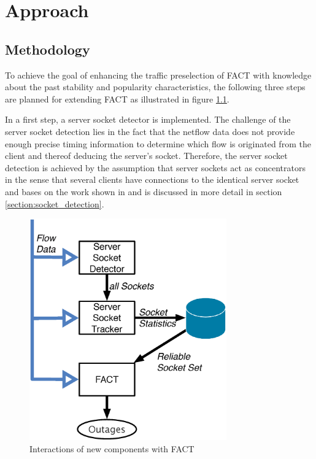 

\chapter{Approach
\label{chapter:approach}}

\section{Methodology
\label{section:methodology}}

To achieve the goal of enhancing the traffic preselection of FACT with
knowledge about the past stability and popularity characteristics, the following
three steps are planned for extending FACT as illustrated in figure 
\ref{fig:FACT}.

In a first step, a server socket detector is implemented. The challenge of the
server socket detection lies in the fact that the netflow data does not provide
enough precise timing information to determine which flow is originated from the
client and thereof deducing the server's socket. Therefore, the server socket
detection is achieved by the assumption that server sockets act as concentrators
in the sense that several clients have connections to the identical server
socket and bases on the work shown in
\cite{Schatzmann:Dissection,Schatzmann:Mining,Schatzmann:Tracing} and is
discussed in more detail in section \ref{section:socket_detection}.

\begin{figure}
	[t] \centering
	\includegraphics[width=8.5cm]{images/Approach_blockdiagram.eps}
	\caption{Interactions of new components with FACT} 
	\label{fig:FACT} 
\end{figure}

